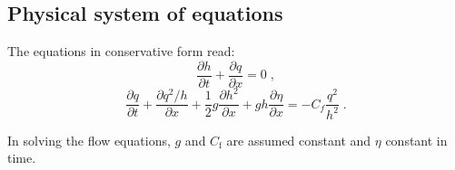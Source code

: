 \documentclass{deltares_report_elv}
\newcommand{\mathsub}[2]{#1_{\mathrm{#2}}}
\begin{document}
\subsection{Physical system of equations}


The \citet{SaintVenant71} equations in conservative form read:
\begin{equation}
\label{eq:sv_mass}
\frac{\partial h}{\partial t}+\frac{\partial q}{\partial x}=0 \;,
\end{equation}
\begin{equation}
\label{eq:sv_mom}
\frac{\partial q}{\partial t}+\frac{\partial q^2/h}{\partial x}+\frac{1}{2}g\frac{\partial h^2}{\partial x}+gh\frac{\partial \eta}{\partial x}=-C_f\frac{q^2}{h^2} \;.
\end{equation}

In solving the flow equations, $g$ and $\mathsub{C}{f}$ are assumed constant and $\eta$ constant in time.
\end{document}
